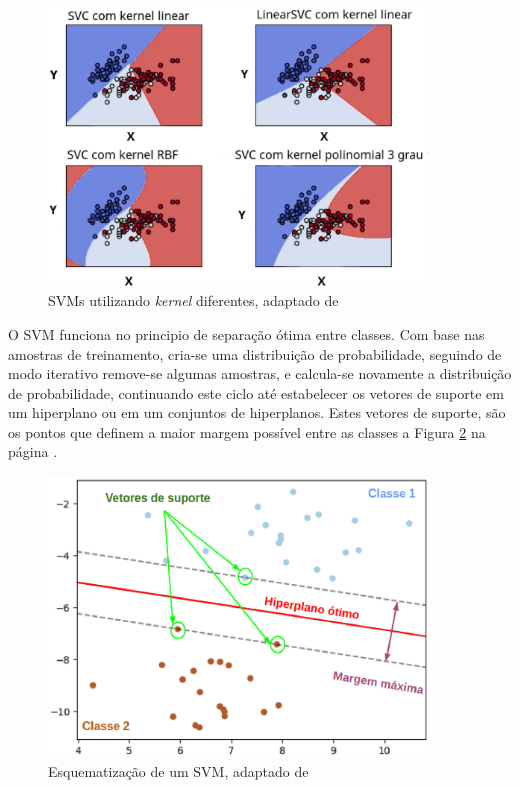\begin{figure}[!htb]
    \centering
     \includegraphics[width=0.9\textwidth]{figuras/svmkernel.eps}
     \caption{SVMs utilizando \textit{kernel} diferentes, adaptado de }
     \label{svmkernel}
 \end{figure}

 O SVM funciona no principio de separação ótima entre classes. Com base nas amostras de treinamento, cria-se uma distribuição de probabilidade, seguindo de modo iterativo remove-se algumas amostras, e calcula-se novamente a distribuição de probabilidade, continuando este ciclo até estabelecer os vetores de suporte em um hiperplano ou em um conjuntos de hiperplanos. Estes vetores de suporte, são os pontos que definem a maior margem possível entre as classes a Figura \ref{svm_hiperplano} na página \pageref{svm_hiperplano} \cite{huang2002assessment}.

 \begin{figure}[!htb]
     \centering
     \includegraphics[width=0.9\textwidth]{figuras/svm_hiperplano.eps}
     \caption{Esquematização de um SVM, adaptado de }
     \label{svm_hiperplano}
 \end{figure}

